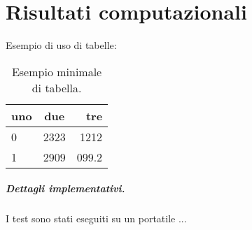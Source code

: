 \chapter[Risultati computazionali]{Risultati computazionali}
Esempio di uso di tabelle:

\begin{table}[ht!]
\begin{center}
\begin{tabular}{l|cr}
uno & due & tre \\
\hline
0 & 2323 & 1212 \\
1 & 2909& 099.2
\end{tabular}
\end{center}
\caption{Esempio minimale di tabella.}\label{tab:2}
\end{table}


\paragraph{Dettagli implementativi.} I test sono stati eseguiti su un portatile ...


